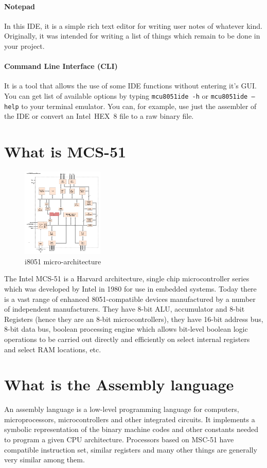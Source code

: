 \documentclass[a4paper,twoside,12pt]{book}
\begin{document}
		\paragraph{Notepad} In this IDE, it is a simple rich text editor for writing user notes of whatever kind. Originally, it was intended for writing a list of things which remain to be done in your project.

		\paragraph{Command Line Interface (CLI)} It is a tool that allows the use of some IDE functions without entering it's GUI. You can get list of available options by typing \texttt{mcu8051ide -h} or \texttt{mcu8051ide --help} to your terminal emulator. You can, for example, use just the assembler of the IDE or convert an Intel\textregistered{}~HEX~8 file to a raw binary file.

	\section{What is MCS-51}
		\begin{figure}
			\centering{}
			\includegraphics[width=110pt]{img/545px-Intel_8051_arch.png}
			\caption{i8051 micro-architecture}
		\end{figure}
		The Intel MCS-51 is a Harvard architecture, single chip microcontroller series which was developed by Intel in 1980 for use in embedded systems. Today there is a vast range of enhanced 8051-compatible devices manufactured by a number of independent manufacturers. They have 8-bit ALU, accumulator and 8-bit Registers (hence they are an 8-bit microcontrollers), they have 16-bit address bus, 8-bit data bus, boolean processing engine which allows bit-level boolean logic operations to be carried out directly and efficiently on select internal registers and select RAM locations, etc.
	\enlargethispage{10\baselineskip}

	\section{What is the Assembly language}
		An assembly language is a low-level programming language for computers, microprocessors, microcontrollers and other integrated circuits. It implements a symbolic representation of the binary machine codes and other constants needed to program a given CPU architecture. Processors based on MSC-51 have compatible instruction set, similar registers and many other things are generally very similar among them.
\end{document}
